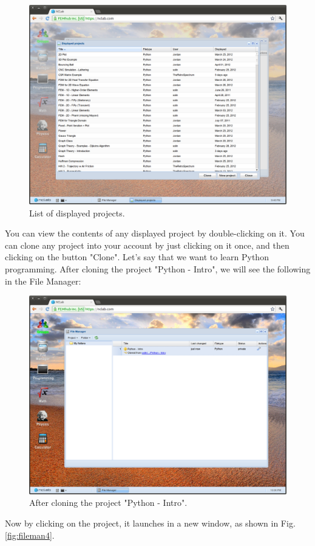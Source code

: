 \documentclass[article,A4,12pt]{llncs}
\begin{document}
\newpage

\begin{figure}[!ht]
\begin{center}
\includegraphics[width=\textwidth]{img/fileman2.png}
\end{center}
\caption{List of displayed projects.}
\label{fig:fileman2}
\end{figure}
\noindent
You can view the contents of any displayed project by double-clicking on it. You can 
clone any project into your account by just clicking on it once, and then clicking on 
the button "Clone". Let's say that we want to learn Python programming. After cloning 
the project "Python - Intro", we will see the following in the File Manager:

\newpage

\begin{figure}[!ht]
\begin{center}
\includegraphics[width=\textwidth]{img/fileman3.png}
\end{center}
\caption{After cloning the project "Python - Intro".}
\label{fig:fileman3}
\end{figure}
\noindent
Now by clicking on the project, it launches in a new window, as
shown in Fig. \ref{fig:fileman4}.
\end{document}
